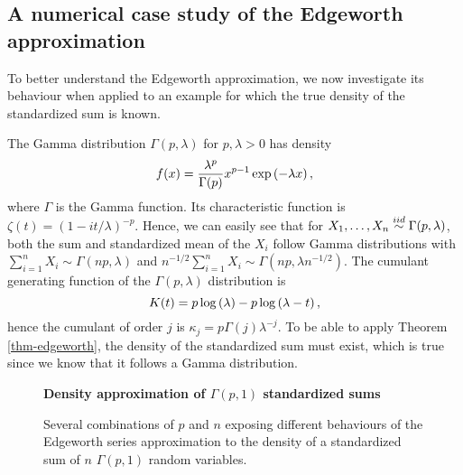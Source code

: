 \subsection{A numerical case study of the Edgeworth approximation}

To better understand the Edgeworth approximation, we now investigate its behaviour when applied to an example for which the true density of the standardized sum is known.

\begin{example} \label{ex-gamma-edge}
    The Gamma distribution $\Gamma(p, \lambda)$ for $p, \lambda > 0$ has density
    \begin{equation*}
        f(x) = \frac{\lambda^p}{\Gamma(p)} x^{p-1} \exp\left(-\lambda x\right),
    \end{equation*}
    where $\Gamma$ is the Gamma function. Its characteristic function is $\zeta(t) = (1 - it/\lambda)^{-p}$. Hence, we can easily see that for $X_1, \ldots, X_n \stackrel{iid}{\sim} \Gamma(p, \lambda)$, both the sum and standardized mean of the $X_i$ follow Gamma distributions with $\sum_{i=1}^n X_i \sim \Gamma(np, \lambda)$ and $n^{-1/2} \sum_{i=1}^n X_i \sim \Gamma(np, \lambda n^{-1/2})$. The cumulant generating function of the $\Gamma(p, \lambda)$ distribution is
    \begin{equation*}
        K(t) = p \log\left(\lambda\right) - p\log\left(\lambda - t\right),
    \end{equation*}
    hence the cumulant of order $j$ is $\kappa_j = p\Gamma(j)\lambda^{-j}$. To be able to apply Theorem \ref{thm-edgeworth}, the density of the standardized sum must exist, which is true since we know that it follows a Gamma distribution.
    

    \begin{figure}[!htbp]
        \textbf{Density approximation of $\Gamma(p,1)$ standardized sums}
        \centering
        \qquad
        \caption{Several combinations of $p$ and $n$ exposing different behaviours of the Edgeworth series approximation to the density of a standardized sum of $n$ $\Gamma(p, 1)$ random variables.}
        \label{fig-edgeworth}
    \end{figure}



\end{example}

